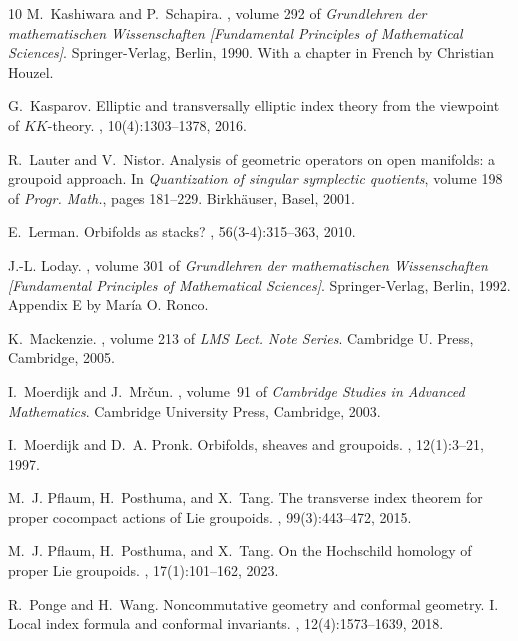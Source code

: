 \documentclass[a4paper]{amsart}
\newcommand\<{\langle}
\renewcommand\>{\rangle}
\theoremstyle{definition}
\theoremstyle{remark}
\begin{document}
\begin{thebibliography}{10}
M.~Kashiwara and P.~Schapira.
, volume 292 of {\em Grundlehren der
  mathematischen Wissenschaften [Fundamental Principles of Mathematical
  Sciences]}.
\newblock Springer-Verlag, Berlin, 1990.
\newblock With a chapter in French by Christian Houzel.

G.~Kasparov.
\newblock Elliptic and transversally elliptic index theory from the viewpoint
  of {$KK$}-theory.
, 10(4):1303--1378, 2016.

R.~Lauter and V.~Nistor.
\newblock Analysis of geometric operators on open manifolds: a groupoid
  approach.
\newblock In {\em Quantization of singular symplectic quotients}, volume 198 of
  {\em Progr. Math.}, pages 181--229. Birkh\"auser, Basel, 2001.

E.~Lerman.
\newblock Orbifolds as stacks?
, 56(3-4):315--363, 2010.

J.-L. Loday.
, volume 301 of {\em Grundlehren der
  mathematischen Wissenschaften [Fundamental Principles of Mathematical
  Sciences]}.
\newblock Springer-Verlag, Berlin, 1992.
\newblock Appendix E by Mar\'ia O. Ronco.

K.~Mackenzie.
, volume
  213 of {\em LMS Lect. Note Series}.
\newblock Cambridge U. Press, Cambridge, 2005.

I.~Moerdijk and J.~Mr{\v{c}}un.
, volume~91 of
  {\em Cambridge Studies in Advanced Mathematics}.
\newblock Cambridge University Press, Cambridge, 2003.

I.~Moerdijk and D.~A. Pronk.
\newblock Orbifolds, sheaves and groupoids.
, 12(1):3--21, 1997.

M.~J. Pflaum, H.~Posthuma, and X.~Tang.
\newblock The transverse index theorem for proper cocompact actions of {L}ie
  groupoids.
, 99(3):443--472, 2015.

M.~J. Pflaum, H.~Posthuma, and X.~Tang.
\newblock On the {H}ochschild homology of proper {L}ie groupoids.
, 17(1):101--162, 2023.

R.~Ponge and H.~Wang.
\newblock Noncommutative geometry and conformal geometry. {I}. {L}ocal index
  formula and conformal invariants.
, 12(4):1573--1639, 2018.


\end{thebibliography}
\end{document}
